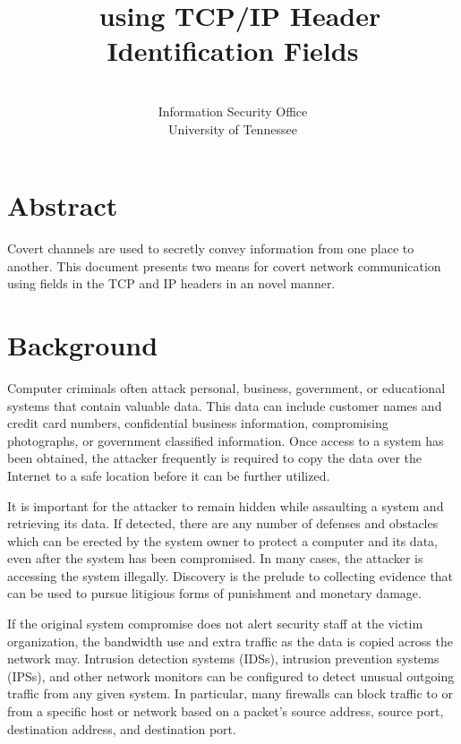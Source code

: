 \documentclass[letterpaper,10pt,draft]{article}
\title{\AJWSubject\ using TCP/IP Header Identification Fields}
\author{\AJWName \\ Information Security Office \\ University of Tennessee \\ \texttt{\AJWEmail}}
\date{\small{\RCSId}}
\begin{document}
\maketitle


\section*{Abstract}

Covert channels are used to secretly convey information from one place
to another.  This document presents two means for covert network
communication using fields in the TCP and IP headers in an novel
manner.

\section{Background}

Computer criminals often attack personal, business, government, or
educational systems that contain valuable data.  This data can include
customer names and credit card numbers, confidential business
information, compromising photographs, or government classified
information.  Once access to a system has been obtained, the attacker
frequently is required to copy the data over the Internet to a safe
location before it can be further utilized.

It is important for the attacker to remain hidden while assaulting a
system and retrieving its data.  If detected, there are any number of
defenses and obstacles which can be erected by the system owner to
protect a computer and its data, even after the system has been
compromised.  In many cases, the attacker is accessing the system
illegally.  Discovery is the prelude to collecting evidence that can
be used to pursue litigious forms of punishment and monetary damage.


If the original system compromise does not alert security staff at the
victim organization, the bandwidth use and extra traffic as the data
is copied across the network may.  Intrusion detection systems
(IDSs), intrusion prevention systems (IPSs), and other network
monitors can be configured to detect unusual outgoing traffic from any
given system.  In particular, many firewalls can block traffic to or
from a specific host or network based on a packet's source address, source
port, destination address, and destination port.
\end{document}
